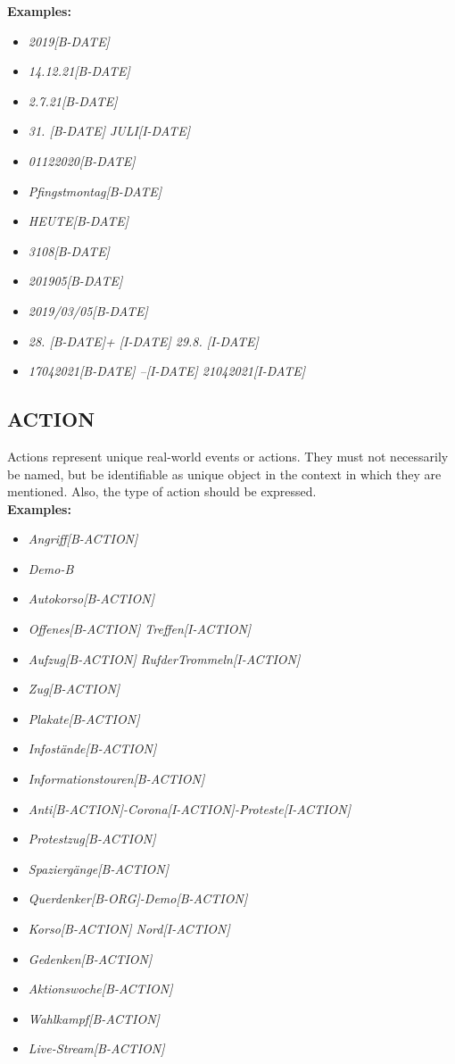 \noindent\textbf{Examples:}
\begin{itemize}
	\item \textit{2019[B-DATE]}
	\item \textit{14.12.21[B-DATE]}
	\item \textit{2.7.21[B-DATE]}
	\item \textit{31. [B-DATE] JULI[I-DATE]}
	\item \textit{01122020[B-DATE]}
	\item \textit{Pfingstmontag[B-DATE]}
	\item \textit{HEUTE[B-DATE]}
	\item \textit{3108[B-DATE]}
	\item \textit{201905[B-DATE]}
	\item \textit{2019/03/05[B-DATE]}
	\item \textit{28. [B-DATE]+ [I-DATE] 29.8. [I-DATE]}
	\item \textit{17042021[B-DATE] –[I-DATE] 21042021[I-DATE]}
\end{itemize}


\subsection*{ACTION}
Actions represent unique real-world events or actions. They must not necessarily be named, but be identifiable as unique object in the context in which they are mentioned. Also, the type of action should be expressed.\\

\noindent\textbf{Examples:}
\begin{itemize}
	\item \textit{Angriff[B-ACTION]}
	\item \textit{Demo-B}
	\item \textit{Autokorso[B-ACTION]}
	\item \textit{Offenes[B-ACTION] Treffen[I-ACTION]}
	\item \textit{Aufzug[B-ACTION] RufderTrommeln[I-ACTION]}
	\item \textit{Zug[B-ACTION]}
	\item \textit{Plakate[B-ACTION]}
	\item \textit{Infostände[B-ACTION]}
	\item \textit{Informationstouren[B-ACTION]}
	\item \textit{Anti[B-ACTION]-Corona[I-ACTION]-Proteste[I-ACTION]}
	\item \textit{Protestzug[B-ACTION]}
	\item \textit{Spaziergänge[B-ACTION]}
	\item \textit{Querdenker[B-ORG]-Demo[B-ACTION]}
	\item \textit{Korso[B-ACTION] Nord[I-ACTION]}
	\item \textit{Gedenken[B-ACTION]}
	\item \textit{Aktionswoche[B-ACTION]}
	\item \textit{Wahlkampf[B-ACTION]}
	\item \textit{Live-Stream[B-ACTION]}
\end{itemize}



